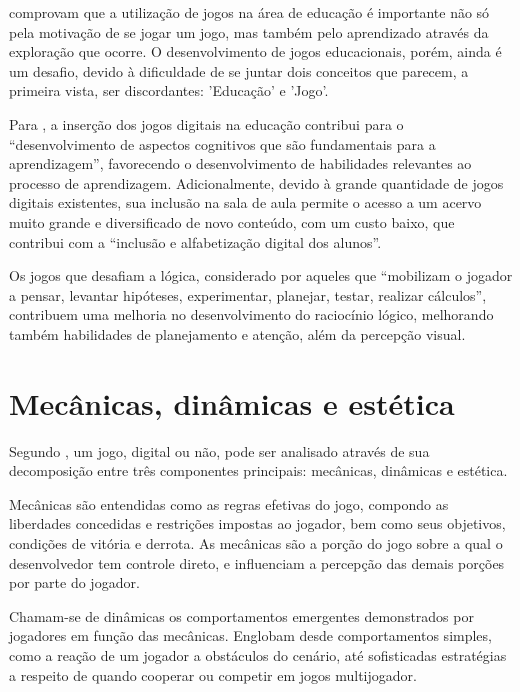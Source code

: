 \cite{correia:2009:digital_games_spore} comprovam que a utilização de jogos 
na área de educação é importante não só pela motivação de se jogar um jogo, 
mas também pelo aprendizado através da exploração que ocorre. O 
desenvolvimento de jogos educacionais, porém, ainda é um desafio, devido 
à dificuldade de se juntar dois conceitos que parecem, a primeira vista,
ser discordantes: 'Educação' e 'Jogo'.

Para \cite{ramos:2013:jogos}, a inserção dos jogos digitais na educação 
contribui para o ``desenvolvimento de aspectos cognitivos que são fundamentais 
para a aprendizagem'', favorecendo o desenvolvimento de habilidades 
relevantes ao processo de aprendizagem. Adicionalmente, devido à 
grande quantidade de jogos digitais existentes, sua inclusão na sala 
de aula permite o acesso a um acervo muito grande e diversificado de 
novo conteúdo, com um custo baixo, que contribui com a ``inclusão e 
alfabetização digital dos alunos''. 

Os jogos que desafiam a lógica, considerado por \cite{ramos:2013:jogos} 
aqueles que ``mobilizam o jogador a pensar, levantar hipóteses, 
experimentar, planejar, testar, realizar cálculos'', contribuem uma
melhoria no desenvolvimento do raciocínio lógico, melhorando 
também habilidades de planejamento e atenção, além da percepção visual. 

\section{Mecânicas, dinâmicas e estética}\label{sec-mecanica-dinamica-estetica}

Segundo \cite{hunicke:2004}, um jogo, digital ou não, pode ser analisado através de
sua decomposição entre três componentes principais: mecânicas, dinâmicas e estética.

Mecânicas são entendidas como as regras efetivas do jogo, compondo as liberdades
concedidas e restrições impostas ao jogador, bem como seus objetivos, condições de
vitória e derrota. As mecânicas são a porção do jogo sobre a qual o desenvolvedor tem
controle direto, e influenciam a percepção das demais porções por parte do jogador.

Chamam-se de dinâmicas os comportamentos emergentes demonstrados por jogadores em 
função das mecânicas. Englobam desde comportamentos simples, como a reação de um
jogador a obstáculos do cenário, até sofisticadas estratégias a respeito de quando
cooperar ou competir em jogos multijogador.

